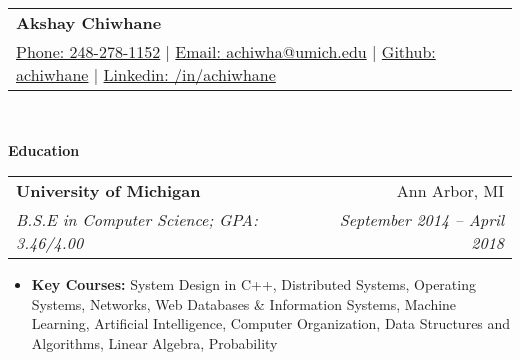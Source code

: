 \documentclass[letterpaper,11pt]{article}
\makeatletter
\newcommand{\resitem}[1]{\item #1 \vspace{-2pt}}
\newcommand{\resheading}[1]{{\large \colorbox{mygrey}{\begin{minipage}{\textwidth}{\textbf{#1 \vphantom{p\^{E}}}}\end{minipage}}}}
\newcommand{\ressubheading}[4]{
\begin{tabular*}{6.875in}{l@{\extracolsep{\fill}}r}
		\textbf{#1} & #2 \\
		\textit{#3} & \textit{#4} \\
\end{tabular*}\vspace{-6pt}}
\renewcommand{\footnotesize}{\fontsize{10pt}{11pt}\selectfont}
\makeatother
\begin{document}
\newcommand{\mywebheader}{
	\begin{tabular*}{7in}{l@{\extracolsep{\fill}}r}
		\textbf{{\LARGE Akshay Chiwhane}} \\
		\href{tel:248-278-1152}{Phone: 248-278-1152} |
		\href{mailto:achiwha@umich.edu}{Email: achiwha@umich.edu} |
		\href{https://github.com/achiwhane}{Github: achiwhane} |
		\href{https://linkedin.com/in/achiwhane}{Linkedin: /in/achiwhane}	\end{tabular*}
		\\
		\vspace{0.1in}}
						
		\mywebheader
						
		\resheading{Education}
		\begin{description}
			\item
			\ressubheading{{University of Michigan}}{Ann Arbor, MI}{B.S.E in Computer Science; GPA: 3.46/4.00}{September 2014 -- April 2018}
			{ \footnotesize
				\begin{itemize}
					\resitem{\textbf{Key Courses:}
						System Design in C++,
						Distributed Systems,
						Operating Systems, 
						Networks,
						Web Databases \& Information Systems,
						Machine Learning,
						Artificial Intelligence,
						Computer Organization,
						Data Structures and Algorithms,
						Linear Algebra,
						Probability
					}
				\end{itemize}
			}
		\end{description} %
						
\end{document}
